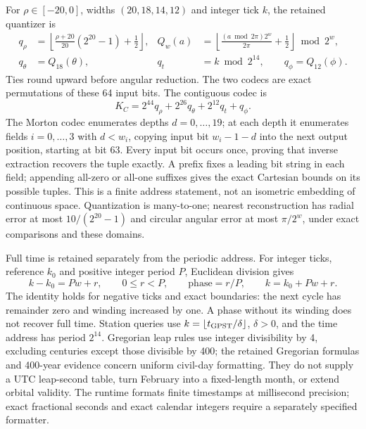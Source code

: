 For $\rho\in[-20,0]$, widths $(20,18,14,12)$ and integer tick $k$, the retained
quantizer is
\begin{align}
 q_\rho&=\left\lfloor\frac{\rho+20}{20}(2^{20}-1)+\frac12\right\rfloor,
 &Q_w(a)&=\left\lfloor\frac{(a\bmod2\pi)2^w}{2\pi}+\frac12\right\rfloor\bmod2^w,\\
 q_\theta&=Q_{18}(\theta),&q_t&=k\bmod2^{14},\qquad q_\phi=Q_{12}(\phi).
\end{align}
Ties round upward before angular reduction. The two codecs are exact
permutations of these 64 input bits. The contiguous codec is
\begin{equation}
 K_C=2^{44}q_\rho+2^{26}q_\theta+2^{12}q_t+q_\phi.
\end{equation}
The Morton codec enumerates depths $d=0,\ldots,19$; at each depth it enumerates
fields $i=0,\ldots,3$ with $d<w_i$, copying input bit $w_i-1-d$ into the next
output position, starting at bit 63. Every input bit occurs once, proving that
inverse extraction recovers the tuple exactly. A prefix fixes a leading bit
string in each field; appending all-zero or all-one suffixes gives the exact
Cartesian bounds on its possible tuples. This is a finite address statement,
not an isometric embedding of continuous space. Quantization is many-to-one;
nearest reconstruction has radial error at most $10/(2^{20}-1)$ and circular
angular error at most $\pi/2^w$, under exact comparisons and these domains.

Full time is retained separately from the periodic address. For integer ticks,
reference $k_0$ and positive integer period $P$, Euclidean division gives
\begin{equation}
 k-k_0=Pw+r,\qquad 0\le r<P,\qquad \text{phase}=r/P,
 \qquad k=k_0+Pw+r .
\end{equation}
The identity holds for negative ticks and exact boundaries: the next cycle has
remainder zero and winding increased by one. A phase without its winding does
not recover full time. Station queries use $k=\lfloor t_{\rm GPST}/\delta\rfloor$,
$\delta>0$, and the time address has period $2^{14}$. Gregorian leap rules use
integer divisibility by 4, excluding centuries except those divisible by 400;
the retained Gregorian formulas and 400-year evidence concern uniform civil-day
formatting. They do not supply a UTC leap-second table, turn February into a
fixed-length month, or extend orbital validity. The runtime formats finite
timestamps at millisecond precision; exact fractional seconds and exact calendar
integers require a separately specified formatter.

